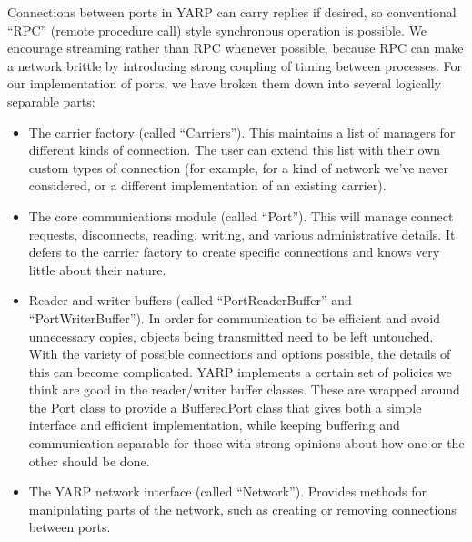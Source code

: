 Connections between ports in YARP can carry replies if desired, so
conventional ``RPC'' (remote procedure call) style synchronous
operation is possible.  We encourage streaming rather than RPC
whenever possible, because RPC can make a network brittle by
introducing strong coupling of timing between processes.
%
%
%
For our implementation of ports, we have broken them down into 
several logically separable parts:

\begin{itemize} \pflist

\item The carrier factory (called ``Carriers'').  This maintains
a list of managers for different kinds of connection.  The user
can extend this list with their own custom types of connection
(for example, for a kind of network we've never considered,
or a different implementation of an existing carrier).


\item The core communications module (called ``Port'').  This
will manage connect requests, disconnects, reading, writing,
and various administrative details.  It defers to the carrier
factory to create specific connections and knows very little
about their nature.

\item Reader and writer buffers (called ``PortReaderBuffer'' and
``PortWriterBuffer'').  In order for communication to be efficient and
avoid unnecessary copies, objects being transmitted need to be left
untouched.  With the variety of possible connections and options
possible, the details of this can become complicated.  YARP implements
a certain set of policies we think are good in the reader/writer
buffer classes.  These are wrapped around the Port class to provide a
BufferedPort class that gives both a simple interface and efficient
implementation, while keeping buffering and communication separable
for those with strong opinions about how one or the other should be
done.

\item The YARP network interface (called ``Network'').  Provides
methods for manipulating parts of the network, such as
creating or removing connections between ports.

\end{itemize}

